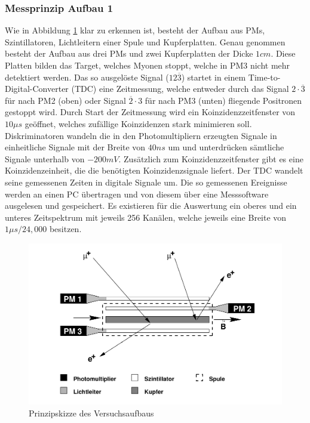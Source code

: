         \subsubsection{Messprinzip Aufbau 1}
            Wie in Abbildung \ref{prinzip} klar zu erkennen ist, besteht der Aufbau aus PMs, Szintillatoren, Lichtleitern einer Spule und Kupferplatten. Genau genommen besteht der Aufbau aus drei PMs und zwei Kupferplatten der Dicke $1\unit{cm}$. Diese Platten bilden das Target, welches Myonen stoppt, welche in PM3 nicht mehr detektiert werden. Das so ausgelöste Signal ($12\overline{3}$) startet in einem Time-to-Digital-Converter (TDC) eine Zeitmessung, welche entweder durch das Signal $2\cdot\overline 3$ für nach PM2 (oben) oder Signal $\overline 2 \cdot 3$ für nach PM3 (unten) fliegende Positronen gestoppt wird. Durch Start der Zeitmessung wird ein Koinzidenzzeitfenster von $10\unit{\mu s}$ geöffnet, welches zufällige Koinzidenzen stark minimieren soll. Diskriminatoren wandeln die in den Photomultipliern erzeugten Signale in einheitliche Signale mit der Breite von $40\unit{ns}$ um und unterdrücken sämtliche Signale unterhalb von $-200\unit{mV}$.
            Zusätzlich zum Koinzidenzzeitfenster gibt es eine Koinzidenzeinheit, die die benötigten Koinzidenzsignale liefert. Der TDC wandelt seine gemessenen Zeiten in digitale Signale um. Die so gemessenen Ereignisse werden an einen PC übertragen und von diesem über eine Messsoftware ausgelesen und gespeichert. Es existieren für die Auswertung ein oberes und ein unteres Zeitspektrum mit jeweils 256 Kanälen, welche jeweils eine Breite von $1\unit{\mu s}/24,000$ besitzen. \cite{PA} 
            \begin{figure}
                \centering \includegraphics[scale=1.2]{pic/aufbau.png}
                \caption{\cite{pm} Prinzipskizze des Versuchsaufbaus}
                \label{prinzip}
            \end{figure}
